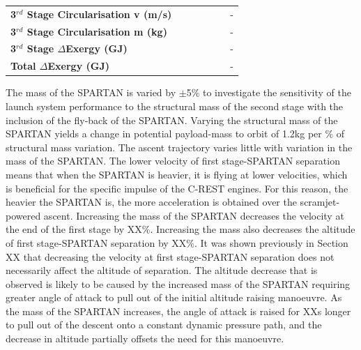 \begin{table}[ht]
\begin{tabular}{l c c c c c c}
	\textbf{3$^{rd}$ Stage Circularisation v (m/s)}
	& \thirdcircvmSPARTANNinetyFive
	& \thirdcircvmSPARTANNinetySevenFive
	& \thirdcircvmSPARTANStandard
	& \thirdcircvmSPARTANOneHundredTwoFive
	& \thirdcircvmSPARTANOneHundredFive
	& -
	\\
	\textbf{3$^{rd}$ Stage Circularisation m (kg)}
	& \thirdcircmmSPARTANNinetyFive
	& \thirdcircmmSPARTANNinetySevenFive
	& \thirdcircmmSPARTANStandard
	& \thirdcircmmSPARTANOneHundredTwoFive
	& \thirdcircmmSPARTANOneHundredFive
	& -
	\\
	\textbf{3$^{rd}$ Stage $\Delta$Exergy (GJ)}
	& \thirddExergymSPARTANNinetyFive
	& \thirddExergymSPARTANNinetySevenFive
	& \thirddExergymSPARTANStandard
	& \thirddExergymSPARTANOneHundredTwoFive
	& \thirddExergymSPARTANOneHundredFive
	& -
	\\
	\textbf{Total $\Delta$Exergy (GJ)}
	& \totaldExergymSPARTANNinetyFive
	& \totaldExergymSPARTANNinetySevenFive
	& \totaldExergymSPARTANStandard
	& \totaldExergymSPARTANOneHundredTwoFive
	& \totaldExergymSPARTANOneHundredFive
	& -
	\\
	\hline 
\end{tabular} 

\end{table}





The mass of the SPARTAN is varied by $\pm$5\% to investigate the sensitivity of the launch system performance to the structural mass of the second stage with the inclusion of the fly-back of the SPARTAN. 
Varying the structural mass of the SPARTAN yields a change in potential payload-mass to orbit of 1.2kg per \% of structural mass variation. 
The ascent trajectory varies little with variation in the mass of the SPARTAN. The lower velocity of first stage-SPARTAN separation means that when the SPARTAN is heavier, it is flying at lower velocities, which is beneficial for the specific impulse of the C-REST engines. For this reason, the heavier the SPARTAN is, the more acceleration is obtained over the scramjet-powered ascent. 
Increasing the mass of the SPARTAN decreases the velocity at the end of the first stage by XX\%. Increasing the mass also decreases the altitude of first stage-SPARTAN separation by XX\%. 
It was shown previously in Section XX that decreasing the velocity at first stage-SPARTAN separation does not necessarily affect the altitude of separation. The altitude decrease that is observed is likely to be caused by the increased mass of the SPARTAN requiring greater angle of attack to pull out of the initial altitude raising manoeuvre. As the mass of the SPARTAN increases, the angle of attack is raised for XXs longer to pull out of the descent onto a constant dynamic pressure path, and the decrease in altitude partially offsets the need for this manoeuvre. 

